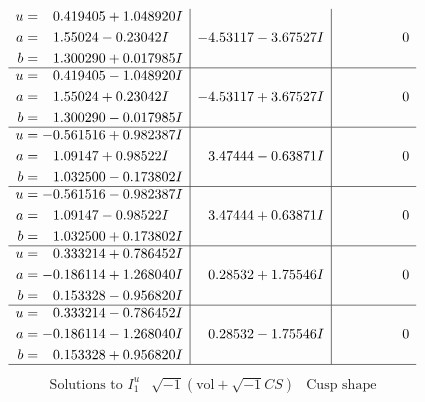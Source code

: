 \documentclass[1p]{elsarticle_modified}
\theoremstyle{definition}
\newcommand{\I}{\sqrt{-1}}
\begin{document}
$$\begin{array}{c|c|c}
\begin{aligned}
u &= \phantom{-}0.419405 + 1.048920 I \\
a &= \phantom{-}1.55024 - 0.23042 I \\
b &= \phantom{-}1.300290 + 0.017985 I\end{aligned}
 & -4.53117 - 3.67527 I & \phantom{-0.000000 } 0 \\ \hline\begin{aligned}
u &= \phantom{-}0.419405 - 1.048920 I \\
a &= \phantom{-}1.55024 + 0.23042 I \\
b &= \phantom{-}1.300290 - 0.017985 I\end{aligned}
 & -4.53117 + 3.67527 I & \phantom{-0.000000 } 0 \\ \hline\begin{aligned}
u &= -0.561516 + 0.982387 I \\
a &= \phantom{-}1.09147 + 0.98522 I \\
b &= \phantom{-}1.032500 - 0.173802 I\end{aligned}
 & \phantom{-}3.47444 - 0.63871 I & \phantom{-0.000000 } 0 \\ \hline\begin{aligned}
u &= -0.561516 - 0.982387 I \\
a &= \phantom{-}1.09147 - 0.98522 I \\
b &= \phantom{-}1.032500 + 0.173802 I\end{aligned}
 & \phantom{-}3.47444 + 0.63871 I & \phantom{-0.000000 } 0 \\ \hline\begin{aligned}
u &= \phantom{-}0.333214 + 0.786452 I \\
a &= -0.186114 + 1.268040 I \\
b &= \phantom{-}0.153328 - 0.956820 I\end{aligned}
 & \phantom{-}0.28532 + 1.75546 I & \phantom{-0.000000 } 0 \\ \hline\begin{aligned}
u &= \phantom{-}0.333214 - 0.786452 I \\
a &= -0.186114 - 1.268040 I \\
b &= \phantom{-}0.153328 + 0.956820 I\end{aligned}
 & \phantom{-}0.28532 - 1.75546 I & \phantom{-0.000000 } 0\\
 \hline 
 \end{array}$$\newpage$$\begin{array}{c|c|c}  
\text{Solutions to }I^u_{1}& \I (\text{vol} + \sqrt{-1}CS) & \text{Cusp shape}\\

\end{array}$$
\end{document}
